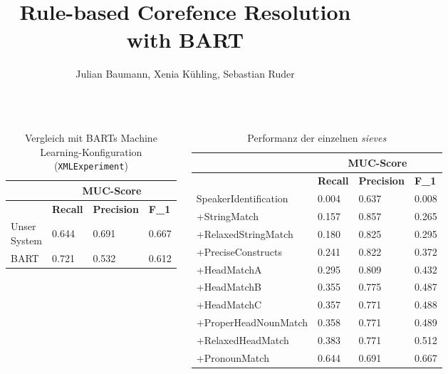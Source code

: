 \documentclass[25pt, a0paper, portrait, margin=10mm, innermargin=15mm,
blockverticalspace=15mm, colspace=15mm, subcolspace=8mm]{tikzposter}
\title{Rule-based Corefence Resolution with BART}
\institute{Institute for Computational Linguistics, Univ. Heidelberg}
\author{Julian Baumann, Xenia Kühling, Sebastian Ruder}
\begin{document}
\maketitle
\begin{columns} 
 
 
{
\begin{table}[h]
\begin{tabular}{l||ll|l}
& \multicolumn{3}{c}{\textbf{MUC-Score}} \\ \hline
               & \textbf{Recall}		 & \textbf{Precision} & \textbf{F\_1}    \\ \hline
Unser System 	& 0.644      & 0.691              & 0.667  \\
BART  & 0.721 		 & 0.532     & 0.612
\end{tabular}
\caption{Vergleich mit BARTs Machine Learning-Konfiguration (\texttt{XMLExperiment})}
\label{tab:ml_vergleich}
\end{table}

\begin{table}[h]
\begin{tabular}{l||ll|l}
& \multicolumn{3}{c}{\textbf{MUC-Score}} \\ \hline
	                 & \textbf{Recall} & \textbf{Precision} & \textbf{F\_1} \\ \hline
SpeakerIdentification & 0.004 & 0.637 & 0.008 \\
+StringMatch & 0.157 & 0.857 & 0.265 \\
+RelaxedStringMatch & 0.180 & 0.825 & 0.295 \\
+PreciseConstructs & 0.241 & 0.822 & 0.372 \\
+HeadMatchA & 0.295 & 0.809 & 0.432 \\
+HeadMatchB & 0.355 & 0.775 & 0.487 \\
+HeadMatchC & 0.357 & 0.771 & 0.488 \\
+ProperHeadNounMatch & 0.358 & 0.771 & 0.489 \\
+RelaxedHeadMatch & 0.383 & 0.771 & 0.512 \\
+PronounMatch & 0.644 & 0.691 & 0.667 \\ 
\end{tabular}
\caption{Performanz der einzelnen \textit{sieves}}
\label{tab:sieve_performanz}
\end{table}

}
\end{columns}
\end{document}
